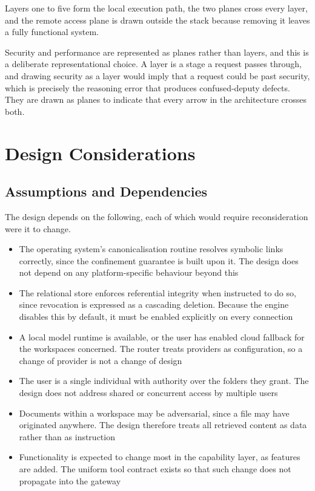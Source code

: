 \documentclass{FastFyp}
\begin{document}
Layers one to five form the local execution path, the two planes cross every layer, and the remote access plane is drawn outside the stack because removing it leaves a fully functional system.

Security and performance are represented as planes rather than layers, and this is a deliberate representational choice. A layer is a stage a request passes through, and drawing security as a layer would imply that a request could be past security, which is precisely the reasoning error that produces confused-deputy defects. They are drawn as planes to indicate that every arrow in the architecture crosses both.


\section{Design Considerations}
\subsection{Assumptions and Dependencies}
The design depends on the following, each of which would require reconsideration were it to change.

\begin{itemize}
    \item The operating system's canonicalisation routine resolves symbolic links correctly, since the confinement guarantee is built upon it. The design does not depend on any platform-specific behaviour beyond this
    \item The relational store enforces referential integrity when instructed to do so, since revocation is expressed as a cascading deletion. Because the engine disables this by default, it must be enabled explicitly on every connection
    \item A local model runtime is available, or the user has enabled cloud fallback for the workspaces concerned. The router treats providers as configuration, so a change of provider is not a change of design
    \item The user is a single individual with authority over the folders they grant. The design does not address shared or concurrent access by multiple users
    \item Documents within a workspace may be adversarial, since a file may have originated anywhere. The design therefore treats all retrieved content as data rather than as instruction
    \item Functionality is expected to change most in the capability layer, as features are added. The uniform tool contract exists so that such change does not propagate into the gateway
\end{itemize}
\end{document}
